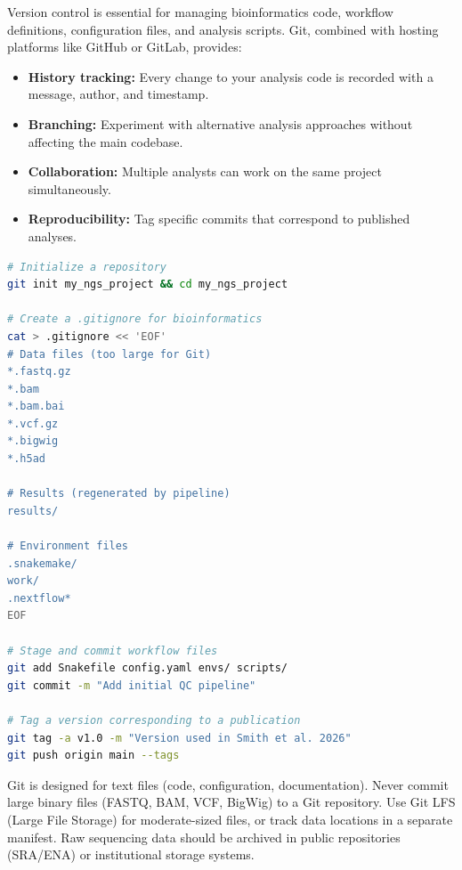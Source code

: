 Version control is essential for managing bioinformatics code, workflow definitions, configuration files, and analysis scripts. Git, combined with hosting platforms like GitHub or GitLab, provides:

\begin{itemize}[itemsep=2pt]
  \item \textbf{History tracking:} Every change to your analysis code is recorded with a message, author, and timestamp.
  \item \textbf{Branching:} Experiment with alternative analysis approaches without affecting the main codebase.
  \item \textbf{Collaboration:} Multiple analysts can work on the same project simultaneously.
  \item \textbf{Reproducibility:} Tag specific commits that correspond to published analyses.
\end{itemize}

\begin{lstlisting}[language=bash,caption={Essential Git workflow for a bioinformatics project.},label=lst:git]
# Initialize a repository
git init my_ngs_project && cd my_ngs_project

# Create a .gitignore for bioinformatics
cat > .gitignore << 'EOF'
# Data files (too large for Git)
*.fastq.gz
*.bam
*.bam.bai
*.vcf.gz
*.bigwig
*.h5ad

# Results (regenerated by pipeline)
results/

# Environment files
.snakemake/
work/
.nextflow*
EOF

# Stage and commit workflow files
git add Snakefile config.yaml envs/ scripts/
git commit -m "Add initial QC pipeline"

# Tag a version corresponding to a publication
git tag -a v1.0 -m "Version used in Smith et al. 2026"
git push origin main --tags
\end{lstlisting}

\begin{warningbox}[title={Never Commit Large Data Files}]
Git is designed for text files (code, configuration, documentation). Never commit large binary files (FASTQ, BAM, VCF, BigWig) to a Git repository. Use Git LFS (Large File Storage) for moderate-sized files, or track data locations in a separate manifest. Raw sequencing data should be archived in public repositories (SRA/ENA) or institutional storage systems.
\end{warningbox}

